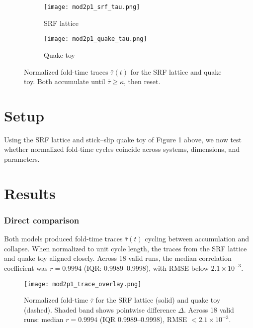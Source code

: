 \documentclass[12pt]{article}
\begin{document}
\begin{figure}[htbp]
  \centering
  \begin{subfigure}{0.48\textwidth}
    \texttt{[image: mod2p1\_srf\_tau.png]}
    \caption{SRF lattice}
    \label{fig:srf_tau}
  \end{subfigure}\hfill
  \begin{subfigure}{0.48\textwidth}
    \texttt{[image: mod2p1\_quake\_tau.png]}
    \caption{Quake toy}
    \label{fig:quake_tau}
  \end{subfigure}
  \caption{Normalized fold-time traces $\bar{\tau}(t)$ for the SRF lattice and quake toy. Both accumulate until $\bar{\tau}\geq\kappa$, then reset.}
  \label{fig:tau_traces}
\end{figure}
\FloatBarrier
\section{Setup} Using the SRF lattice and stick–slip quake toy of Figure 1 above, we now test whether normalized fold-time cycles coincide across systems, dimensions, and parameters.

\section{Results}

\subsubsection{Direct comparison}
Both models produced fold-time traces $\bar{\tau}(t)$ cycling between accumulation and collapse.
When normalized to unit cycle length, the traces from the SRF lattice and quake toy aligned closely.
Across 18 valid runs, the median correlation coefficient was $r = 0.9994$ (IQR: 0.9989--0.9998), with RMSE below $2.1 \times 10^{-3}$.

\begin{figure}[htbp]
  \centering
  \texttt{[image: mod2p1\_trace\_overlay.png]}
  \caption{Normalized fold-time $\bar{\tau}$ for the SRF lattice (solid) and quake toy (dashed). Shaded band shows pointwise difference $\Delta$. Across 18 valid runs: median $r=0.9994$ (IQR 0.9989–0.9998), RMSE $< 2.1\times 10^{-3}$.}

  \label{fig:trace_overlay}
\end{figure}
\FloatBarrier
\end{document}
